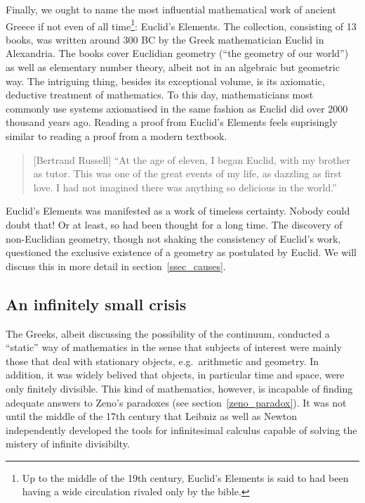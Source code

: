 \documentclass[hidelinks]{article}
\begin{document}
Finally, we ought to name the most influential mathematical work of ancient Greece if not even of all time\footnote{Up to the middle of the 19th century, Euclid's Elements is said to had been having a wide circulation rivaled only by the bible.}: Euclid's Elements. The collection, consisting of 13 books, was written around 300 BC by the Greek mathematician Euclid in Alexandria. The books cover Euclidian geometry (``the geometry of our world'') as well as elementary number theory, albeit not in an algebraic but geometric way. The intriguing thing, besides its exceptional volume, is its axiomatic, deductive treatment of mathematics. To this day, mathematicians most commonly use systems axiomatised in the same fashion as Euclid did over 2000 thousand years ago. Reading a proof from Euclid's Elements feels suprisingly similar to reading a proof from a modern textbook.
\begin{quote}[Bertrand Russell]
	``At the age of eleven, I began Euclid, with my brother as tutor. This was one of the great events of my life, as dazzling as first love. I had not imagined there was anything so delicious in the world.''\cite{russell_autobiography}
\end{quote}
Euclid's Elements was manifested as a work of timeless certainty. Nobody could doubt that! Or at least, so had been thought for a long time. The discovery of non-Euclidian geometry, though not shaking the consistency of Euclid's work, questioned the exclusive existence of a geometry as postulated by Euclid. We will discuss this in more detail in section~\ref{ssec_causes}.

\subsection{An infinitely small crisis}
The Greeks, albeit discussing the possibility of the continuum, conducted a ``static'' way of mathematics in the sense that subjects of interest were mainly those that deal with stationary objects, e.g.\ arithmetic and geometry. In addition, it was widely belived that objects, in particular time and space, were only finitely divisible. This kind of mathematics, however, is incapable of finding adequate answers to Zeno's paradoxes (see section~\ref{zeno_paradox}).
It was not until the middle of the 17th century that Leibniz as well as Newton independently developed the tools for infinitesimal calculus capable of solving the mistery of infinite divisibilty.
\end{document}
